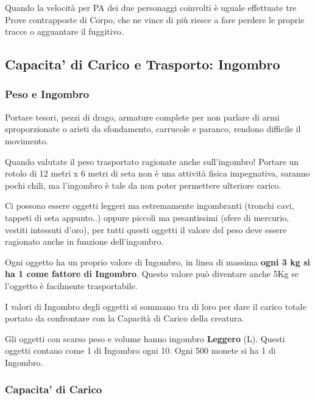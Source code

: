 \documentclass[12pt,a4paper,twoside,openany]{book}
\begin{document}
\begin{multicols}{2}
Quando la velocità per PA dei due personaggi coinvolti è uguale effettuate tre Prove contrapposte di Corpo, che ne vince di più riesce a fare perdere le proprie tracce o agguantare il fuggitivo.

\subsection{Capacita' di Carico e Trasporto: Ingombro}

\label{sec:capacita-di-carico-e-trasporto-ingombro}

\subsubsection{Peso e Ingombro}

Portare tesori, pezzi di drago, armature complete per non parlare di armi sproporzionate o arieti da sfondamento, carrucole e paranco, rendono difficile il movimento.

Quando valutate il peso trasportato ragionate anche sull'ingombro!
Portare un rotolo di 12 metri x 6 metri di seta non è una attività fisica impegnativa, saranno pochi chili, ma l'ingombro è tale da non poter permettere ulteriore carico.

Ci possono essere oggetti leggeri ma estremamente ingombranti (tronchi cavi, tappeti di seta appunto..) oppure piccoli ma pesantissimi (sfere di mercurio, vestiti intessuti d'oro), per tutti questi oggetti il valore del peso deve essere ragionato anche in funzione dell'ingombro.

Ogni oggetto ha un proprio valore di Ingombro, in linea di massima \textbf{ogni 3 kg si ha 1 come fattore di Ingombro}. Questo valore può diventare anche 5Kg se l'oggetto è facilmente trasportabile.

I valori di Ingombro degli oggetti si sommano tra di loro per dare il carico totale portato da confrontare con la Capacità di Carico della creatura.

Gli oggetti con scarso peso e volume hanno ingombro \textbf{Leggero} (L). Questi oggetti contano come 1 di Ingombro ogni 10. Ogni 500 monete si ha 1 di Ingombro.


\subsubsection{Capacita' di Carico}\label{capacitadicarico}


\end{multicols}
\end{document}
